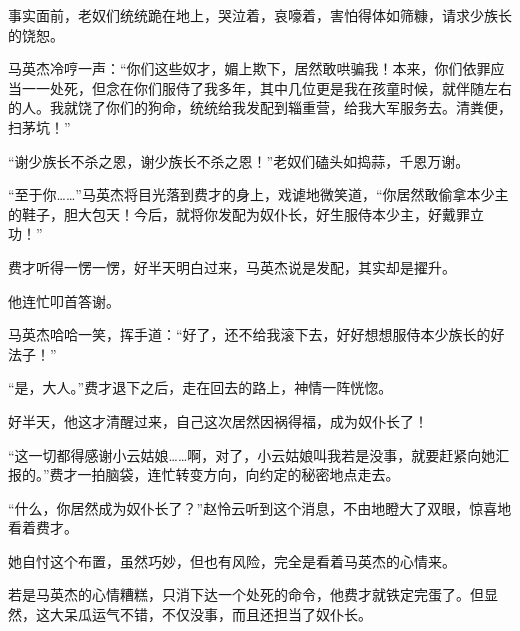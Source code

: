 \begin{this_body}
事实面前，老奴们统统跪在地上，哭泣着，哀嚎着，害怕得体如筛糠，请求少族长的饶恕。

马英杰冷哼一声：“你们这些奴才，媚上欺下，居然敢哄骗我！本来，你们依罪应当一一处死，但念在你们服侍了我多年，其中几位更是我在孩童时候，就伴随左右的人。我就饶了你们的狗命，统统给我发配到辎重营，给我大军服务去。清粪便，扫茅坑！”

“谢少族长不杀之恩，谢少族长不杀之恩！”老奴们磕头如捣蒜，千恩万谢。

“至于你……”马英杰将目光落到费才的身上，戏谑地微笑道，“你居然敢偷拿本少主的鞋子，胆大包天！今后，就将你发配为奴仆长，好生服侍本少主，好戴罪立功！”

费才听得一愣一愣，好半天明白过来，马英杰说是发配，其实却是擢升。

他连忙叩首答谢。

马英杰哈哈一笑，挥手道：“好了，还不给我滚下去，好好想想服侍本少族长的好法子！”

“是，大人。”费才退下之后，走在回去的路上，神情一阵恍惚。

好半天，他这才清醒过来，自己这次居然因祸得福，成为奴仆长了！

“这一切都得感谢小云姑娘……啊，对了，小云姑娘叫我若是没事，就要赶紧向她汇报的。”费才一拍脑袋，连忙转变方向，向约定的秘密地点走去。

“什么，你居然成为奴仆长了？”赵怜云听到这个消息，不由地瞪大了双眼，惊喜地看着费才。

她自忖这个布置，虽然巧妙，但也有风险，完全是看着马英杰的心情来。

若是马英杰的心情糟糕，只消下达一个处死的命令，他费才就铁定完蛋了。但显然，这大呆瓜运气不错，不仅没事，而且还担当了奴仆长。

\end{this_body}

